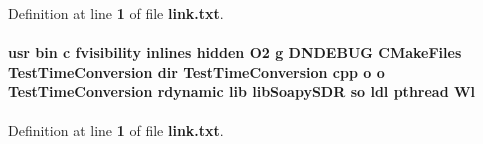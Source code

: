 Definition at line {\bf 1} of file {\bf link.\+txt}.

\paragraph[{Wl}]{\setlength{\rightskip}{0pt plus 5cm}usr bin {\bf c} fvisibility inlines hidden O2 g D\+N\+D\+E\+B\+UG C\+Make\+Files Test\+Time\+Conversion dir Test\+Time\+Conversion cpp o o Test\+Time\+Conversion rdynamic lib lib\+Soapy\+S\+DR {\bf so} ldl {\bf pthread} Wl}\label{soapysdr_2build_2tests_2CMakeFiles_2TestTimeConversion_8dir_2link_8txt_a7c5f0c0055a60721bfcb2a4cde1c6934}


Definition at line {\bf 1} of file {\bf link.\+txt}.

